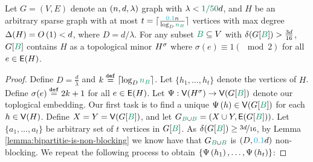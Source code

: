 \documentclass[11pt]{article}
\begin{document}
\begin{theorem}\label{theorem:embedding-theorem}
  Let $G=(V,E)$ denote an $(n, d, \lambda)$ graph with $\lambda < \epsilonL d$, and $H$ be an arbitrary sparse graph with at most $t = \lceil \frac{\epsilonA n}{\log_D \na}\rceil $ vertices with max degree $\Delta(H) = O\left(1\right) < d$, where $D=d/\lambda$.
  For any subset $\GreenB \subseteq V$ with $\MinimalDegree{G[\GreenB]} > \frac{3d}{16}$, $G[\GreenB]$ contains $H$ as a topological minor ${H}^{\sigma}$ where  $\sigma(e) \equiv 1 (\mod 2)$ for all $e \in \mathsf{E}(H)$.
\end{theorem}
\begin{proof}
Define $D = \frac{d}{\lambda}$ and $k \Def \lceil\log_D\na\rceil$.
Let $\{ h_1, \dots, h_t\}$ denote the vertices of $H$.
Define $\sigma(e) \text{}\overset{\mathtt{def}}{=} 2k+1$ for all $e \in \mathsf{E}(H)$.
Let $\EmbeddingFunc: \Vertices{\Subdivision{H}{\sigma}} \rightarrow \Vertices{G[{\GreenB}]}$ denote our toplogical embedding.
Our first task is to find a unique $\Embedding{h} \in \Vertices{G[\GreenB]}$ for each $h \in \mathsf{V}(H)$.
Define $X = Y = \Vertices{G[\GreenB]}$, and let $\BipartiteG = (X \cup Y, \Edges{G[\GreenB]})$.
Let $\{a_1, \dots, a_{t}\}$ be arbitrary set of $t$ vertices in $G[\GreenB]$.
As $\MinimalDegree{G[\GreenB]} \geq \nicefrac{3d}{16}$, by Lemma \ref{lemma:bipartitie-is-non-blocking} we know have that $\BipartiteG$ is $(D, \epsilonA d)$ non-blocking.
We repeat the following process to obtain $\{ \Psi\left(h_1\right), \dots, \Psi\left(h_t\right)\}$: 


\end{proof}
\end{document}
